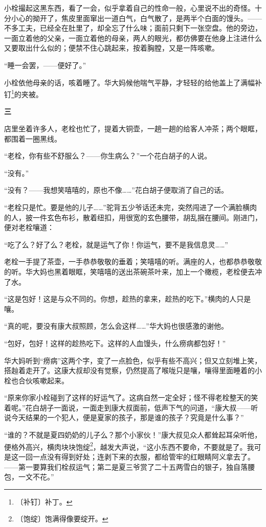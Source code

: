 \documentclass[12pt,UTF-8,openany]{ctexbook}
\begin{document}
\begin{large}
    小栓撮起这黑东西，看了一会，似乎拿着自己的性命一般，心里说不出的奇怪。十分小心的拗开了，焦皮里面窜出一道白气，白气散了，是两半个白面的馒头。——不多工夫，已经全在肚里了，却全忘了什么味；面前只剩下一张空盘。他的旁边，一面立着他的父亲，一面立着他的母亲，两人的眼光，都仿佛要在他身上注进什么又要取出什么似的；便禁不住心跳起来，按着胸膛，又是一阵咳嗽。
    
    “睡一会罢，——便好了。”
    
    小栓依他母亲的话，咳着睡了。华大妈候他喘气平静，才轻轻的给他盖上了满幅补钉\footnote{〔补钉〕补丁。}的夹被。
    
    \begin{center}\textbf{三}\end{center}
    
    店里坐着许多人，老栓也忙了，提着大铜壶，一趟一趟的给客人冲茶；两个眼眶，都围着一圈黑线。
    
    “老栓，你有些不舒服么？——你生病么？”一个花白胡子的人说。
    
    “没有。”
    
    “没有？——我想笑嘻嘻的，原也不像……”花白胡子便取消了自己的话。
    
    “老栓只是忙。要是他的儿子……”驼背五少爷话还未完，突然闯进了一个满脸横肉的人，披一件玄色布衫，散着纽扣，用很宽的玄色腰带，胡乱捆在腰间。刚进门，便对老栓嚷道：
    
    “吃了么？好了么？老栓，就是运气了你！你运气，要不是我信息灵……”
    
    老栓一手提了茶壶，一手恭恭敬敬的垂着；笑嘻嘻的听。满座的人，也都恭恭敬敬的听。华大妈也黑着眼眶，笑嘻嘻的送出茶碗茶叶来，加上一个橄榄，老栓便去冲了水。
    
    “这是包好！这是与众不同的。你想，趁热的拿来，趁热的吃下。”横肉的人只是嚷。
    
    “真的呢，要没有康大叔照顾，怎么会这样……”华大妈也很感激的谢他。
    
    “包好，包好！这样的趁热吃下。这样的人血馒头，什么痨病都包好！”
    
    华大妈听到“痨病”这两个字，变了一点脸色，似乎有些不高兴；但又立刻堆上笑，搭赸着走开了。这康大叔却没有觉察，仍然提高了喉咙只是嚷，嚷得里面睡着的小栓也合伙咳嗽起来。
    
    “原来你家小栓碰到了这样的好运气了。这病自然一定全好；怪不得老栓整天的笑着呢。”花白胡子一面说，一面走到康大叔面前，低声下气的问道，“康大叔——听说今天结果的一个犯人，便是夏家的孩子，那是谁的孩子？究竟是什么事？”
    
    “谁的？不就是夏四奶奶的儿子么？那个小家伙！”康大叔见众人都耸起耳朵听他，便格外高兴，横肉块块饱绽\footnote{〔饱绽〕饱满得像要绽开。}，越发大声说，“这小东西不要命，不要就是了。我可是这一回一点没有得到好处；连剥下来的衣服，都给管牢的红眼睛阿义拿去了。——第一要算我们栓叔运气；第二是夏三爷赏了二十五两雪白的银子，独自落腰包，一文不花。”
    

\end{large}
\end{document}
